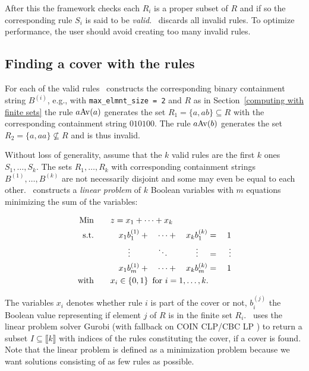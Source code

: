 After this the framework checks each $R_i$ is a proper subset of $R$ and if so 
the corresponding rule $S_i$ is said to be \emph{valid}. \CombCov\ discards all 
invalid rules. To optimize performance, the user should avoid creating too many 
invalid rules.


\subsection{Finding a cover with the rules}

For each of the valid rules \CombCov\ constructs the corresponding binary 
containment string $B^{(i)}$, e.g., with \texttt{max\_elmnt\_size = 2} and $R$ 
as in Section~\ref{computing with finite sets} the rule $a {\mathrm{Av}\!\left(a\right)}$ generates 
the set $R_1 = \{ a, ab \} \subseteq R$ with the corresponding containment 
string $010100$. The rule $a {\mathrm{Av}\!\left(b\right)}$ generates the set $R_2 = \{ a, aa \} \not 
\subseteq R$ and is thus invalid.

Without loss of generality, assume that the $k$ valid rules are the first $k$ 
ones $S_1, \ldots, S_k$. The sets $R_1, \ldots, R_k$ with corresponding 
containment strings $B^{(1)}, \ldots, B^{(k)}$ are not necessarily disjoint and 
some may even be equal to each other. \CombCov\ constructs a \emph{linear 
problem} of $k$ Boolean variables with $m$ equations minimizing the sum of the
variables:

\begin{alignat*}{5}
    \text{Min}  \qquad  & \mathrlap{z = x_1 + \dotsb + x_k}   & & & & & & & \\
    \text{s.t.} \qquad  & &                             x_1 b^{(1)}_{1}         & +{} & \dotsb & +{} &                             x_k b^{(k)}_{1}             & ={} & 1      \\
                        & & \mathrel{\makebox[\widthof{$x_1 b^{(1)}_{j}$}]{\vdots}} & & \ddots &     & \mathrel{\makebox[\widthof{$x_1 b^{(k)}_{j}$}]{\vdots}} & ={} & \vdots \\
                        & &                             x_1 b^{(1)}_{m}         & +{} & \dotsb & +{} &                             x_k b^{(k)}_{m}             & ={} & 1      \\
    \text{with} \qquad  & \mathrlap{x_i \in \left\{ 0, 1 \right\} \text{ for } i = 1, \dotsc, k.} & & & & & & &
\end{alignat*}

The variables $x_i$ denotes whether rule $i$ is part of the cover or not, 
$b^{(j)}_{i}$ the Boolean value representing if element $j$ of $R$ is in the 
finite set $R_i$. \CombCov\ uses the linear problem solver Gurobi 
\cite{lcc_gurobi_optimization_gurobi_2019} (with fallback on COIN CLP/CBC LP 
\cite{coin-or_coin_2019}) to return a subset $I \subseteq \llbracket k 
\rrbracket$ with indices of the rules constituting the cover, if a cover is 
found. Note that the linear problem is defined as a minimization problem because 
we want solutions consisting of as few rules as possible.


